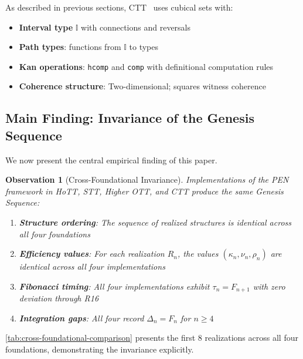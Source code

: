 \documentclass[11pt]{article}
\newtheorem{observation}[theorem]{Observation}
\theoremstyle{definition}
\theoremstyle{remark}
\begin{document}
As described in previous sections, CTT~\cite{cohen2018cubical} uses cubical sets with:
\begin{itemize}
\item \textbf{Interval type} $\mathbb{I}$ with connections and reversals
\item \textbf{Path types}: functions from $\mathbb{I}$ to types
\item \textbf{Kan operations}: \texttt{hcomp} and \texttt{comp} with definitional computation rules
\item \textbf{Coherence structure}: Two-dimensional; squares witness coherence
\end{itemize}

\subsection{Main Finding: Invariance of the Genesis Sequence}
\label{subsec:main-finding}

We now present the central empirical finding of this paper.

\begin{observation}[Cross-Foundational Invariance]
\label{obs:cross-foundational-invariance}
Implementations of the PEN framework in HoTT, STT, Higher OTT, and CTT produce the same Genesis Sequence:
\begin{enumerate}
\item \textbf{Structure ordering}: The sequence of realized structures is identical across all four foundations
\item \textbf{Efficiency values}: For each realization $R_n$, the values $(\kappa_n, \nu_n, \rho_n)$ are identical across all four implementations
\item \textbf{Fibonacci timing}: All four implementations exhibit $\tau_n = F_{n+1}$ with zero deviation through R16
\item \textbf{Integration gaps}: All four record $\Delta_n = F_n$ for $n \geq 4$
\end{enumerate}
\end{observation}

\cref{tab:cross-foundational-comparison} presents the first 8 realizations across all four foundations, demonstrating the invariance explicitly.
\end{document}
